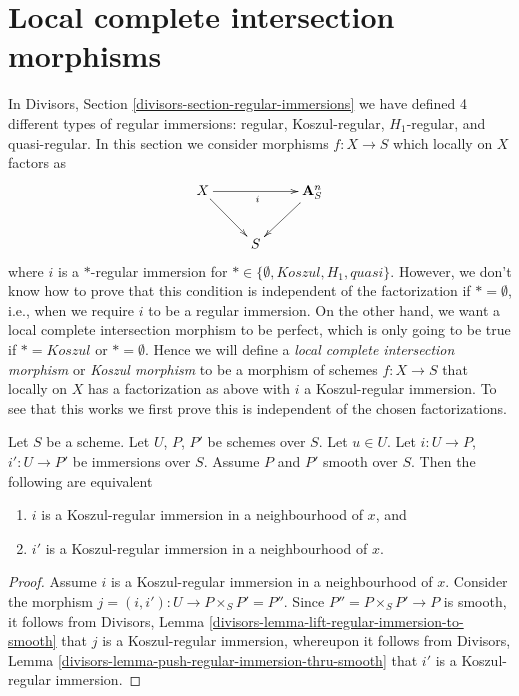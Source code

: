 \section{Local complete intersection morphisms}
\label{section-lci}

\noindent
In
Divisors, Section \ref{divisors-section-regular-immersions}
we have defined 4 different types of regular immersions: regular,
Koszul-regular, $H_1$-regular, and quasi-regular. In this section
we consider morphisms $f : X \to S$ which locally on $X$ factors as
$$
\xymatrix{
X \ar[rr]_i \ar[rd] & & \mathbf{A}^n_S \ar[ld] \\
& S
}
$$
where $i$ is a $*$-regular immersion for
$* \in \{\emptyset, Koszul, H_1, quasi\}$.
However, we don't know how to prove that this condition is independent
of the factorization if $* = \emptyset$, i.e., when we require $i$ to
be a regular immersion. On the other hand, we want a
local complete intersection morphism to be perfect, which is only
going to be true if $* = Koszul$ or $* = \emptyset$. Hence we will define a
{\it local complete intersection morphism} or
{\it Koszul morphism} to be a morphism of schemes $f : X \to S$
that locally on $X$ has a factorization as above with $i$ a Koszul-regular
immersion. To see that this works we first prove this is independent
of the chosen factorizations.

\begin{lemma}
\label{lemma-koszul-independence-factorization}
Let $S$ be a scheme. Let $U$, $P$, $P'$ be schemes over $S$.
Let $u \in U$. Let $i : U \to P$, $i' : U \to P'$ be immersions over $S$.
Assume $P$ and $P'$ smooth over $S$. Then the following are equivalent
\begin{enumerate}
\item $i$ is a Koszul-regular immersion in a neighbourhood of $x$, and
\item $i'$ is a Koszul-regular immersion in a neighbourhood of $x$.
\end{enumerate}
\end{lemma}

\begin{proof}
Assume $i$ is a Koszul-regular immersion in a neighbourhood of $x$.
Consider the morphism $j = (i, i') : U \to P \times_S P' = P''$.
Since $P'' = P \times_S P' \to P$ is smooth, it follows from
Divisors, Lemma \ref{divisors-lemma-lift-regular-immersion-to-smooth}
that $j$ is a Koszul-regular immersion, whereupon it follows from
Divisors, Lemma \ref{divisors-lemma-push-regular-immersion-thru-smooth}
that $i'$ is a Koszul-regular immersion.
\end{proof}


